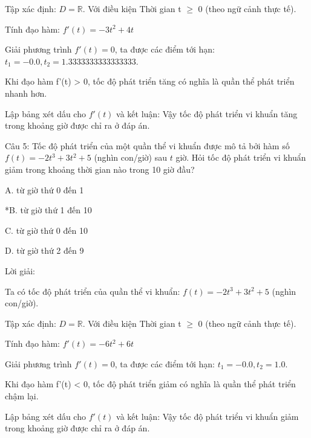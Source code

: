 \documentclass[a4paper,12pt]{article}
\begin{document}
Tập xác định: \(D = \mathbb{R}\).
Với điều kiện Thời gian t $\geq$ 0 (theo ngữ cảnh thực tế).

Tính đạo hàm:
\(f'(t) = -3t^{2}+ 4t\)

Giải phương trình \(f'(t) = 0\), ta được các điểm tới hạn:
\(t_1 = -0.0, t_2 = 1.3333333333333333\).



Khi đạo hàm f'(t) > 0, tốc độ phát triển tăng có nghĩa là quần thể phát triển nhanh hơn.

Lập bảng xét dấu cho \(f'(t)\) và kết luận: Vậy tốc độ phát triển vi khuẩn tăng trong khoảng giờ được chỉ ra ở đáp án.



Câu 5: Tốc độ phát triển của một quần thể vi khuẩn được mô tả bởi hàm số \(f(t) = -2t^{3}+ 3t^{2}+ 5\) (nghìn con/giờ) sau \(t\) giờ. 
            Hỏi tốc độ phát triển vi khuẩn giảm trong khoảng thời gian nào trong 10 giờ đầu?

A. từ giờ thứ 0 đến 1

*B. từ giờ thứ 1 đến 10

C. từ giờ thứ 0 đến 10

D. từ giờ thứ 2 đến 9

Lời giải:

Ta có tốc độ phát triển của quần thể vi khuẩn: \(f(t) = -2t^{3}+ 3t^{2}+ 5\) (nghìn con/giờ).

Tập xác định: \(D = \mathbb{R}\).
Với điều kiện Thời gian t $\geq$ 0 (theo ngữ cảnh thực tế).

Tính đạo hàm:
\(f'(t) = -6t^{2}+ 6t\)

Giải phương trình \(f'(t) = 0\), ta được các điểm tới hạn:
\(t_1 = -0.0, t_2 = 1.0\).



Khi đạo hàm f'(t) < 0, tốc độ phát triển giảm có nghĩa là quần thể phát triển chậm lại.

Lập bảng xét dấu cho \(f'(t)\) và kết luận: Vậy tốc độ phát triển vi khuẩn giảm trong khoảng giờ được chỉ ra ở đáp án.
\end{document}

